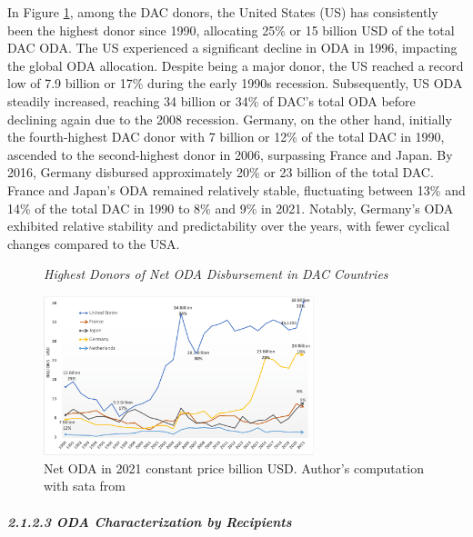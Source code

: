 
In Figure \ref{fig:Highest ODA donors}, among the DAC donors, the United States (US) has consistently been the highest donor since 1990, allocating 25\% or 15 billion USD of the total DAC ODA. The US experienced a significant decline in ODA in 1996, impacting the global ODA allocation. Despite being a major donor, the US reached a record low of 7.9 billion or 17\% during the early 1990s recession. Subsequently, US ODA steadily increased, reaching 34 billion or 34\% of DAC's total ODA before declining again due to the 2008 recession. Germany, on the other hand, initially the fourth-highest DAC donor with 7 billion or 12\% of the total DAC in 1990, ascended to the second-highest donor in 2006, surpassing France and Japan. By 2016, Germany disbursed approximately 20\% or 23 billion of the total DAC. France and Japan's ODA remained relatively stable, fluctuating between 13\% and 14\% of the total DAC in 1990 to 8\% and 9\% in 2021. Notably, Germany's ODA exhibited relative stability and predictability over the years, with fewer cyclical changes compared to the USA.

\begin{figure}[ht]
\captionsetup{justification=justified,singlelinecheck=false}
\caption{\textit{Highest Donors of Net ODA Disbursement in DAC Countries}}
\vspace{4pt}
    \centering \includegraphics[width = 0.7\textwidth]{Figures/ODA_Graphs/Top_DAC_Donors.pdf}
    \caption*{\footnotesize{Net ODA in 2021 constant price billion USD. Author's computation with sata from \textcite{oecd_Data_2023}}}
    \label{fig:Highest ODA donors}
\end{figure}

\paragraph{\quad \quad \textit{2.1.2.3 ODA Characterization by Recipients}}
